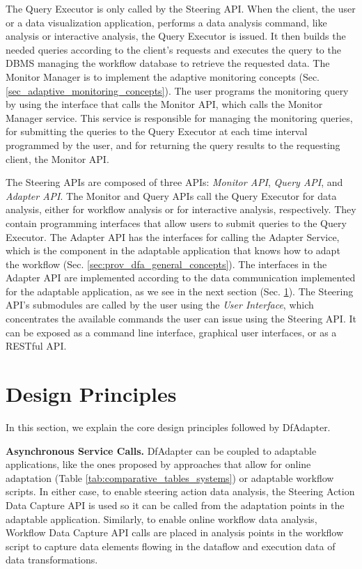 The Query Executor is only called by the Steering API. When the client, \ie{} the user or a data visualization application, performs a data analysis command, like analysis or interactive analysis, the Query Executor is issued.
It then builds the needed queries according to the client's requests and executes the query to the DBMS managing the
workflow database to retrieve the requested data. The Monitor Manager is to implement the adaptive monitoring concepts (Sec. \ref{sec_adaptive_monitoring_concepts}). The user programs the monitoring query by using the interface that calls the Monitor API, which calls the Monitor Manager service. This service is responsible for managing the monitoring queries, for submitting the queries to the Query Executor at each time interval programmed by the user, and for returning the query results to the requesting client, \ie{} the Monitor API.


The Steering APIs are composed of three APIs: \textit{Monitor API}, \textit{Query API}, and \textit{Adapter API}.
The Monitor and Query APIs call the Query Executor for data analysis, either for workflow analysis or for interactive analysis, respectively.
They contain programming interfaces that allow users to submit queries to the Query Executor.
The Adapter API has the interfaces for calling the Adapter Service, which is the component in the adaptable application that knows how to adapt the workflow (Sec. \ref{sec:prov_dfa_general_concepts}).
The interfaces in the Adapter API are implemented according to the data communication implemented for the adaptable application, as we see in the next section (Sec. \ref{wfscript_system-design-principles}).
The Steering API's submodules are called by the user using the \textit{User Interface}, which concentrates the available commands the user can issue using the Steering API. It can be exposed as a command line interface, graphical user interfaces, or as a RESTful API.


\section{Design Principles}
\label{wfscript_system-design-principles}

In this section, we explain the core design principles followed
by DfAdapter.

\textbf{Asynchronous Service Calls.}
DfAdapter can be coupled to adaptable
applications, like the ones proposed by approaches that allow for online adaptation (Table \ref{tab:comparative_tables_systems})
or adaptable workflow scripts.
In either case, to enable steering action data analysis,
the Steering Action Data Capture API is used so it can be called from the adaptation points in the adaptable application.
Similarly, to enable online workflow data analysis,
Workflow Data Capture API calls are placed in analysis points in the workflow
script to capture data elements flowing in the dataflow and execution data of data
transformations.

